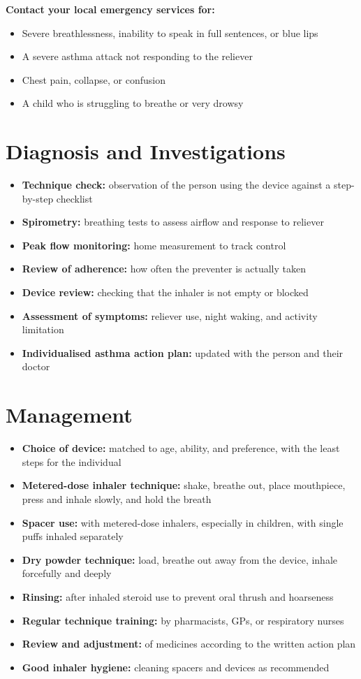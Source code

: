 \textbf{Contact your local emergency services for:}
\begin{itemize}
    \item Severe breathlessness, inability to speak in full sentences, or blue lips
    \item A severe asthma attack not responding to the reliever
    \item Chest pain, collapse, or confusion
    \item A child who is struggling to breathe or very drowsy
\end{itemize}

\section*{Diagnosis and Investigations}
\begin{itemize}
    \item \textbf{Technique check:} observation of the person using the device against a step-by-step checklist
    \item \textbf{Spirometry:} breathing tests to assess airflow and response to reliever
    \item \textbf{Peak flow monitoring:} home measurement to track control
    \item \textbf{Review of adherence:} how often the preventer is actually taken
    \item \textbf{Device review:} checking that the inhaler is not empty or blocked
    \item \textbf{Assessment of symptoms:} reliever use, night waking, and activity limitation
    \item \textbf{Individualised asthma action plan:} updated with the person and their doctor
\end{itemize}

\section*{Management}
\begin{itemize}
    \item \textbf{Choice of device:} matched to age, ability, and preference, with the least steps for the individual
    \item \textbf{Metered-dose inhaler technique:} shake, breathe out, place mouthpiece, press and inhale slowly, and hold the breath
    \item \textbf{Spacer use:} with metered-dose inhalers, especially in children, with single puffs inhaled separately
    \item \textbf{Dry powder technique:} load, breathe out away from the device, inhale forcefully and deeply
    \item \textbf{Rinsing:} after inhaled steroid use to prevent oral thrush and hoarseness
    \item \textbf{Regular technique training:} by pharmacists, GPs, or respiratory nurses
    \item \textbf{Review and adjustment:} of medicines according to the written action plan
    \item \textbf{Good inhaler hygiene:} cleaning spacers and devices as recommended
\end{itemize}

